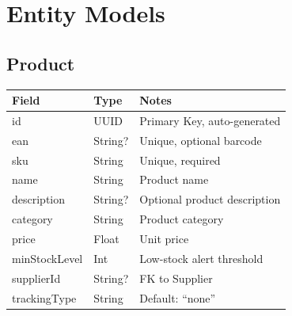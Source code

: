 \documentclass[12pt,a4paper]{report}
\begin{document}
\section{Entity Models}

\subsection{Product}
\begin{table}[H]
    \centering
    \renewcommand{\arraystretch}{1.3}
    \begin{tabularx}{\textwidth}{|l|l|X|}
        \hline
        \textbf{Field} & \textbf{Type} & \textbf{Notes} \\
        \hline
        id & UUID & Primary Key, auto-generated \\
        ean & String? & Unique, optional barcode \\
        sku & String & Unique, required \\
        name & String & Product name \\
        description & String? & Optional product description \\
        category & String & Product category \\
        price & Float & Unit price \\
        minStockLevel & Int & Low-stock alert threshold \\
        supplierId & String? & FK to Supplier \\
        trackingType & String & Default: ``none'' \\
        \hline
    \end{tabularx}
\end{table}
\end{document}

